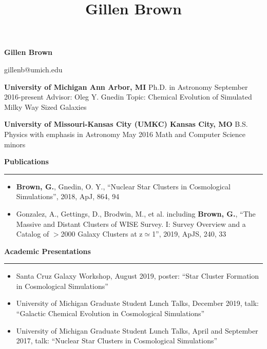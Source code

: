 \documentclass[10pt]{article}
\title{Gillen Brown}
\newcommand{\header}[1]{\vspace{2em}\par \textbf{\large #1}\strut\hrule\vspace{0em}}
\newcommand{\actionHeader}[2]{\textbf{#1 \hfill #2}}
\newcommand{\indentedItemDate}[2]{\newline\null\qquad #1 \hfill #2}
\newcommand{\indentedItem}[1]{\newline\null\qquad #1}
\begin{document}
\thispagestyle{empty}


\begin{center}
{\huge \bf Gillen Brown}

{\Large gillenb@umich.edu}
\end{center}
\bigskip

\actionHeader{University of Michigan}{Ann Arbor, MI}
\indentedItemDate{Ph.D. in Astronomy}{September 2016-present}
\indentedItem{Advisor: Oleg Y. Gnedin} 
\indentedItem{Topic: Chemical Evolution of Simulated Milky Way Sized Galaxies}

\actionHeader{University of Missouri-Kansas City (UMKC)}{Kansas City, MO}
\indentedItemDate{B.S. Physics with emphasis in Astronomy}{May 2016}
\indentedItem{Math and Computer Science minors}

\header{Publications}
\begin{itemize}
    \item \textbf{Brown, G.}, Gnedin, O. Y.,  ``Nuclear Star Clusters in Cosmological Simulations'', 2018, ApJ, 864, 94
    \item Gonzalez, A., Gettings, D., Brodwin, M., et al. including \textbf{Brown, G.}, ``The Massive and Distant Clusters of WISE Survey. I: Survey Overview and a Catalog of $>$2000 Galaxy Clusters at z$\simeq$1'', 2019, ApJS, 240, 33
\end{itemize}

\header{Academic Presentations}
\begin{itemize}
    \item Santa Cruz Galaxy Workshop, August 2019, poster: ``Star Cluster Formation in Cosmological Simulations''
    \item University of Michigan Graduate Student Lunch Talks, December 2019, talk: ``Galactic Chemical Evolution in Cosmological Simulations''
    \item University of Michigan Graduate Student Lunch Talks, April and September 2017, talk: ``Nuclear Star Clusters in Cosmological Simulations''
\end{itemize}
\end{document}
